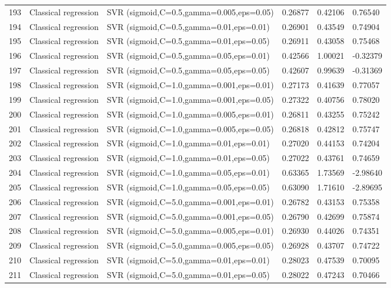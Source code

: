 \documentclass[10pt]{article}
\begin{document}
\begin{longtable}{C{0.75cm}L{2.35cm}L{8.0cm}C{1.15cm}C{1.15cm}C{1.15cm}}
193 & Classical regression & SVR (sigmoid,C=0.5,gamma=0.005,eps=0.05) & 0.26877 & 0.42106 & 0.76540 \\
194 & Classical regression & SVR (sigmoid,C=0.5,gamma=0.01,eps=0.01) & 0.26901 & 0.43549 & 0.74904 \\
195 & Classical regression & SVR (sigmoid,C=0.5,gamma=0.01,eps=0.05) & 0.26911 & 0.43058 & 0.75468 \\
196 & Classical regression & SVR (sigmoid,C=0.5,gamma=0.05,eps=0.01) & 0.42566 & 1.00021 & -0.32379 \\
197 & Classical regression & SVR (sigmoid,C=0.5,gamma=0.05,eps=0.05) & 0.42607 & 0.99639 & -0.31369 \\
198 & Classical regression & SVR (sigmoid,C=1.0,gamma=0.001,eps=0.01) & 0.27173 & 0.41639 & 0.77057 \\
199 & Classical regression & SVR (sigmoid,C=1.0,gamma=0.001,eps=0.05) & 0.27322 & 0.40756 & 0.78020 \\
200 & Classical regression & SVR (sigmoid,C=1.0,gamma=0.005,eps=0.01) & 0.26811 & 0.43255 & 0.75242 \\
201 & Classical regression & SVR (sigmoid,C=1.0,gamma=0.005,eps=0.05) & 0.26818 & 0.42812 & 0.75747 \\
202 & Classical regression & SVR (sigmoid,C=1.0,gamma=0.01,eps=0.01) & 0.27020 & 0.44153 & 0.74204 \\
203 & Classical regression & SVR (sigmoid,C=1.0,gamma=0.01,eps=0.05) & 0.27022 & 0.43761 & 0.74659 \\
204 & Classical regression & SVR (sigmoid,C=1.0,gamma=0.05,eps=0.01) & 0.63365 & 1.73569 & -2.98640 \\
205 & Classical regression & SVR (sigmoid,C=1.0,gamma=0.05,eps=0.05) & 0.63090 & 1.71610 & -2.89695 \\
206 & Classical regression & SVR (sigmoid,C=5.0,gamma=0.001,eps=0.01) & 0.26782 & 0.43153 & 0.75358 \\
207 & Classical regression & SVR (sigmoid,C=5.0,gamma=0.001,eps=0.05) & 0.26790 & 0.42699 & 0.75874 \\
208 & Classical regression & SVR (sigmoid,C=5.0,gamma=0.005,eps=0.01) & 0.26930 & 0.44026 & 0.74351 \\
209 & Classical regression & SVR (sigmoid,C=5.0,gamma=0.005,eps=0.05) & 0.26928 & 0.43707 & 0.74722 \\
210 & Classical regression & SVR (sigmoid,C=5.0,gamma=0.01,eps=0.01) & 0.28023 & 0.47539 & 0.70095 \\
211 & Classical regression & SVR (sigmoid,C=5.0,gamma=0.01,eps=0.05) & 0.28022 & 0.47243 & 0.70466 \\

\end{longtable}
\end{document}
